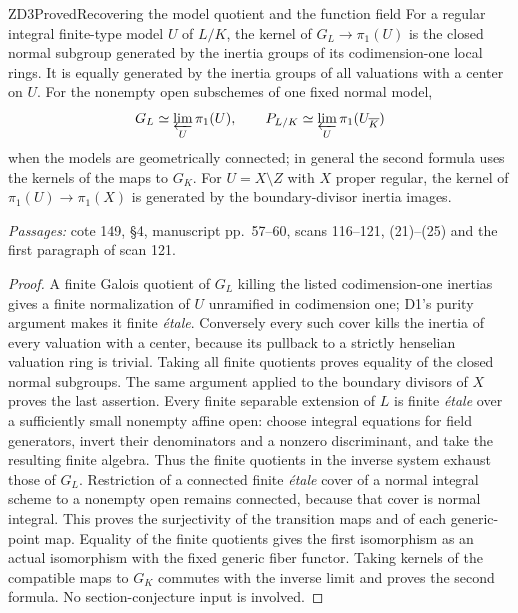\begin{result}{ZD3}{Proved}{Recovering the model quotient and the function field}
For a regular integral finite-type model $U$ of $L/K$, the kernel of $G_L\to\pi_1(U)$ is the closed normal subgroup generated by the inertia groups of its codimension-one local rings. It is equally generated by the inertia groups of all valuations with a center on $U$. For the nonempty open subschemes of one fixed normal model,
\[
 G_L\simeq\varprojlim_U\pi_1(U),\qquad
 P_{L/K}\simeq\varprojlim_U\pi_1(U_{\overline K})
\]
when the models are geometrically connected; in general the second formula uses the kernels of the maps to $G_K$. For $U=X\setminus Z$ with $X$ proper regular, the kernel of $\pi_1(U)\to\pi_1(X)$ is generated by the boundary-divisor inertia images.
\par\emph{Passages:} cote 149, \S4, manuscript pp.~57--60, scans 116--121, (21)--(25) and the first paragraph of scan 121.
\end{result}
\begin{proof}
A finite Galois quotient of $G_L$ killing the listed codimension-one inertias gives a finite normalization of $U$ unramified in codimension one; D1's purity argument makes it finite \emph{\'etale}. Conversely every such cover kills the inertia of every valuation with a center, because its pullback to a strictly henselian valuation ring is trivial. Taking all finite quotients proves equality of the closed normal subgroups. The same argument applied to the boundary divisors of $X$ proves the last assertion.
Every finite separable extension of $L$ is finite \emph{\'etale} over a sufficiently small nonempty affine open: choose integral equations for field generators, invert their denominators and a nonzero discriminant, and take the resulting finite algebra. Thus the finite quotients in the inverse system exhaust those of $G_L$. Restriction of a connected finite \emph{\'etale} cover of a normal integral scheme to a nonempty open remains connected, because that cover is normal integral. This proves the surjectivity of the transition maps and of each generic-point map. Equality of the finite quotients gives the first isomorphism as an actual isomorphism with the fixed generic fiber functor. Taking kernels of the compatible maps to $G_K$ commutes with the inverse limit and proves the second formula. No section-conjecture input is involved.
\end{proof}

